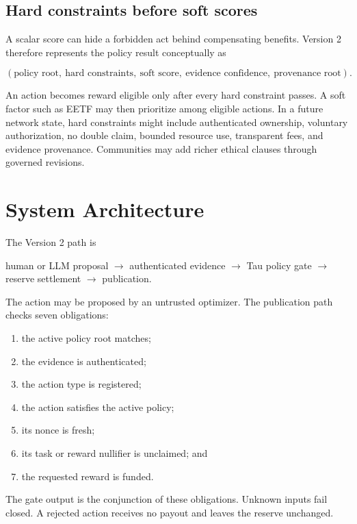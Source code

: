 \documentclass[11pt]{article}
\begin{document}
\subsection{Hard constraints before soft scores}

A scalar score can hide a forbidden act behind compensating benefits.  Version
2 therefore represents the policy result conceptually as

\[
  (\text{policy root},\ \text{hard constraints},\ \text{soft score},\
    \text{evidence confidence},\ \text{provenance root}).
\]

An action becomes reward eligible only after every hard constraint passes.  A
soft factor such as EETF may then prioritize among eligible actions.  In a
future network state, hard constraints might include authenticated ownership,
voluntary authorization, no double claim, bounded resource use, transparent
fees, and evidence provenance.  Communities may add richer ethical clauses
through governed revisions.

\section{System Architecture}

The Version 2 path is

\begin{center}
human or LLM proposal $\rightarrow$ authenticated evidence $\rightarrow$
Tau policy gate $\rightarrow$ reserve settlement $\rightarrow$ publication.
\end{center}

The action may be proposed by an untrusted optimizer.  The publication path
checks seven obligations:

\begin{enumerate}
  \item the active policy root matches;
  \item the evidence is authenticated;
  \item the action type is registered;
  \item the action satisfies the active policy;
  \item its nonce is fresh;
  \item its task or reward nullifier is unclaimed; and
  \item the requested reward is funded.
\end{enumerate}

The gate output is the conjunction of these obligations.  Unknown inputs fail
closed.  A rejected action receives no payout and leaves the reserve unchanged.
\end{document}
